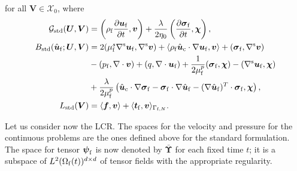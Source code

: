 \documentclass[11pt,english]{article}
\def\ufluid{\boldsymbol{u}_{\rm{f}}}
\def\ufluidhat{\hat{\boldsymbol{u}}_{\rm{f}}}
\def\sigmafluid{\boldsymbol{\sigma}_{\rm{f}}}
\def\pfluid{p_{\rm{f}}}
\def\psifluid{\boldsymbol{\psi}_{\rm{f}}}
\def\viscs{\mu^{s}_{\rm{f}}}
\def\viscp{\mu^{p}_{\rm{f}}}
\def\alevelocityhat{\hat{\boldsymbol{u}}_{\mathrm{c}}}
\begin{document}
for all $\boldsymbol{V}\in\boldsymbol{\mathcal{X}}_0$, where 
\begin{align}
    \mathcal{G}_{\text{std}}(\boldsymbol{U},\boldsymbol{V}) & =\left(\rho_{\rm{f}}\dfrac{\partial\ufluid}{\partial t},\boldsymbol{v}\right)+\dfrac{\lambda}{2\eta_{0}}\left(\frac{\partial\sigmafluid}{\partial t},\boldsymbol{\chi}\right), \\
    B_{\text{std}}(\ufluidhat;\boldsymbol{U},\boldsymbol{V}) & =2(\viscs\nabla^{\rm s}\ufluid,\nabla^{\rm s}\boldsymbol{v})+\langle\rho_{\rm{f}}\alevelocityhat\cdot\nabla\ufluid,\boldsymbol{v}\rangle+(\sigmafluid,\nabla^{\rm s}\boldsymbol{v})\nonumber \\
     & -(\pfluid,\nabla\cdot\boldsymbol{v})+(q,\nabla\cdot\ufluid)+\dfrac{1}{2\viscp}(\sigmafluid,\boldsymbol{\chi})-(\nabla^{\rm s}\ufluid,\boldsymbol{\chi})\nonumber \\
     & +\dfrac{\lambda}{2\viscp}\left(\alevelocityhat\cdot\nabla\sigmafluid-\sigmafluid\cdot\nabla\ufluidhat-(\nabla\ufluidhat)^{T}\cdot\sigmafluid,\boldsymbol{\chi}\right),\label{eq:bilinear_problem}\\
    L_{\text{std}}(\boldsymbol{V}) & =\langle\boldsymbol{f},\boldsymbol{v}\rangle + \langle\boldsymbol{t}_{\rm f},\boldsymbol{v}\rangle_{\Gamma_{{\rm f} , N}}.
\end{align}

Let us consider now the LCR. The spaces for the velocity and pressure for the continuous
problems are the ones defined above for the standard formulation. The space for tensor $\psifluid$ is now denoted by $\bar{\boldsymbol{\Upsilon}}$
for each fixed time $t$; it is a subspace of $L^2(\Omega_{\rm f}(t))^{d\times d }$ of tensor fields with the appropriate regularity.
\end{document}
